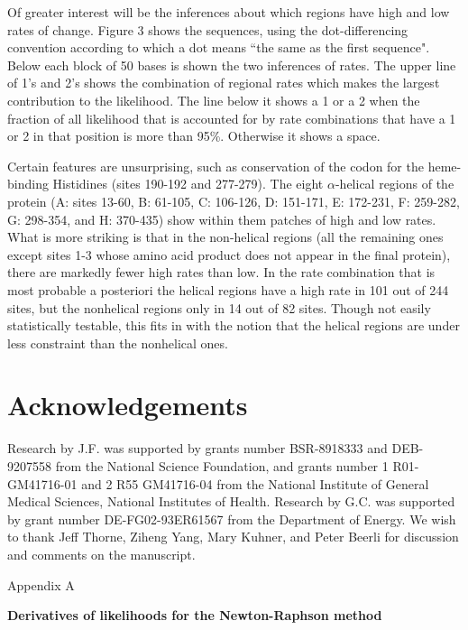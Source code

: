 \documentclass[12pt]{article}
\begin{document}
Of greater interest will be the inferences about which regions have high and
low rates of change.  Figure 3 shows the sequences, using the dot-differencing
convention according to which a dot means ``the same as the first sequence".
Below each block of 50 bases is shown the two inferences of rates.  The
upper line of 1's and 2's shows the combination of regional rates which
makes the largest contribution to the likelihood.  The line below it shows
a 1 or a 2 when the fraction of all likelihood that is accounted for by
rate combinations that have a 1 or 2 in that position is more than 95\%.
Otherwise it shows a space.

Certain features are unsurprising, such as conservation of the
codon for the heme-binding Histidines (sites 190-192 and 277-279).  The
eight $\alpha$-helical regions of the protein (A: sites 13-60, B: 61-105,
C: 106-126, D: 151-171, E: 172-231, F: 259-282, G: 298-354, and H: 370-435)
show within them patches of high and low rates.  What is more striking is
that in the non-helical regions (all the remaining ones except sites 1-3 whose
amino acid product does not appear in the final protein), there are markedly
fewer high rates than low.  In the rate combination that is most probable a
posteriori the helical regions have a high rate in 101 out of 244 sites,
but the nonhelical regions only in 14 out of 82 sites.  Though not easily
statistically testable, this fits in with the notion that the helical
regions are under less constraint than the nonhelical ones.

\section*{Acknowledgements}

Research by J.F. was supported by grants number BSR-8918333 and DEB-9207558
from the National Science Foundation, and grants number 1 R01-GM41716-01 
and 2 R55 GM41716-04 from the National Institute of General Medical Sciences,
National Institutes of Health.  
Research by G.C. was supported by grant number DE-FG02-93ER61567
from the Department of Energy.
We wish to thank Jeff Thorne, Ziheng Yang, Mary Kuhner, and Peter Beerli 
for discussion and comments on the manuscript.

\newpage


\appendix
\noindent
Appendix A
\bigskip

\def\theequation{A\arabic{equation}}
\setcounter{equation}{0}

\noindent
{\bf Derivatives of likelihoods for the Newton-Raphson method}
\bigskip
\end{document}
